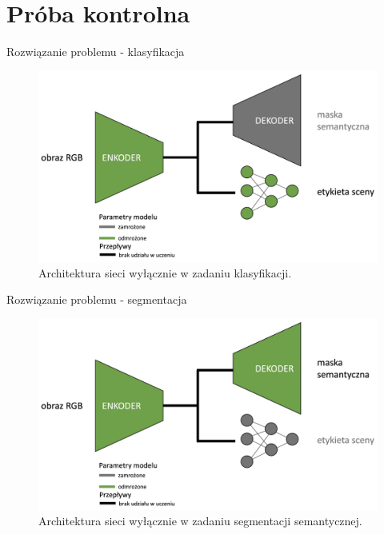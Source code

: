 \documentclass[10pt]{beamer}
\begin{document}
\section*{Próba kontrolna}
\begin{frame}{Rozwiązanie problemu - klasyfikacja}
    \begin{figure}
        \includegraphics[width=\textwidth]{images/decoder-freezed.png}
        \caption{Architektura sieci wyłącznie w zadaniu klasyfikacji.}
    \end{figure}
\end{frame}
\begin{frame}{Rozwiązanie problemu - segmentacja}
    \begin{figure}
        \includegraphics[width=\textwidth]{images/fc-freezed.png}
        \caption{Architektura sieci wyłącznie w zadaniu segmentacji semantycznej.}
    \end{figure}
\end{frame}
\end{document}
